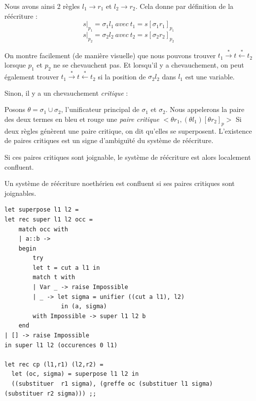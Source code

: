 Nous avons ainsi 2 règles $l_1 \rightarrow r_1$ et $l_2 \rightarrow r_2$. Cela donne par définition de la réécriture :
$$ s|_{p_1} = \sigma_1 l_1\ avec\ t_1=s[\sigma_1 r_1]_{p_1} $$
$$ s|_{p_2} = \sigma_2 l_2\ avec\ t_2=s[\sigma_2 r_2]_{p_2} $$

On montre facilement (de manière visuelle) que nous pouvons trouver 
$t_1 \overset{*}{\rightarrow} t \overset{*}{\leftarrow} t_2$ lorsque
$p_1$ et $p_2$ ne se chevauchent pas. Et lorsqu'il y a chevauchement, on peut également trouver 
$t_1 \overset{*}{\rightarrow} t \overset{*}{\leftarrow} t_2$ si la position de $\sigma_2 l_2$ dans $l_1$ 
 est une variable.

\vspace{0.2cm}
Sinon, il y a un chevauchement \textit{critique} :
\begin{center}
	\end{center}

	Posons $\theta =  \sigma_1 \cup \sigma_2$, l'unificateur principal de $\sigma_1$ et $\sigma_2$.
	Nous appelerons la paire des deux termes en bleu et rouge
	 une \textit{paire critique} $<\theta r_1, (\theta l_1)[\theta r_2]_p > $
	 Si deux règles génèrent une paire critique, on dit qu'elles se superposent.
     L'existence de paires critiques est un signe d'ambiguïté du système de réécriture.

	 Si ces paires critiques sont joignable, le système de réécriture est alors localement confluent.
	 \begin{theoreme}
		  Un système de réécriture noethérien est confluent si ses paires critiques sont joignables.
	\end{theoreme}
\begin{verbatim}
let superpose l1 l2 =
let rec super l1 l2 occ =
	match occ with
	| a::b -> 
	begin
		try 
		let t = cut a l1 in
		match t with 
		| Var _ -> raise Impossible
		| _ -> let sigma = unifier ((cut a l1), l2)
				in (a, sigma)
		with Impossible -> super l1 l2 b 
	end
| [] -> raise Impossible
in super l1 l2 (occurences 0 l1)

let rec cp (l1,r1) (l2,r2) =
  let (oc, sigma) = superpose l1 l2 in
  ((substituer  r1 sigma), (greffe oc (substituer l1 sigma) (substituer r2 sigma))) ;;  
\end{verbatim}


